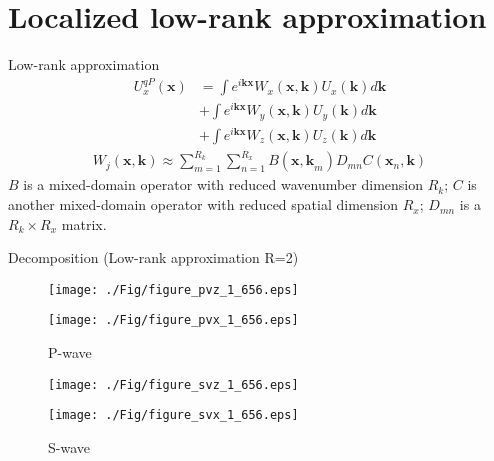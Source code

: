 \documentclass[aspectratio=169]{beamer}
\begin{document}
\section{Localized low-rank approximation}
\begin{frame}{Low-rank approximation}
\begin{eqnarray*}
U^{qP}_x(\mathbf{x})&=\int e^{i\mathbf{kx}}W_x(\mathbf{x,k})U_x(\mathbf{k})d\mathbf{k}\\
                    &+\int e^{i\mathbf{kx}}W_y(\mathbf{x,k})U_y(\mathbf{k})d\mathbf{k}\\
                    &+\int e^{i\mathbf{kx}}W_z(\mathbf{x,k})U_z(\mathbf{k})d\mathbf{k}
\end{eqnarray*}
\begin{eqnarray*}
W_j(\mathbf{x,k})\approx \sum^{R_k}_{m=1}\sum^{R_x}_{n=1}B(\mathbf{x,k}_{m})D_{m n}C(\mathbf{x}_{n},\mathbf{k})
\end{eqnarray*}
$B$ is a mixed-domain operator with reduced wavenumber dimension $R_k$; $C$ is another mixed-domain operator with reduced spatial dimension $R_x$; $D_{m n}$ is a $R_k \times R_x$ matrix. 
\end{frame}
\begin{frame}{Decomposition (Low-rank approximation R=2)}
\center
   \begin{figure}[ht]
        \begin{minipage}[b]{0.25\linewidth}
            \centering
            \texttt{[image: ./Fig/figure\_pvz\_1\_656.eps]}

            \texttt{[image: ./Fig/figure\_pvx\_1\_656.eps]}
            \caption{P-wave}
        \end{minipage}
        \hspace{0.5cm}
        \begin{minipage}[b]{0.25\linewidth}
            \centering
            \texttt{[image: ./Fig/figure\_svz\_1\_656.eps]}

            \texttt{[image: ./Fig/figure\_svx\_1\_656.eps]}
            \caption{S-wave}
        \end{minipage}
    \end{figure}

\end{frame}
\end{document}
